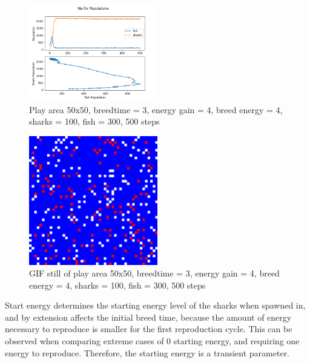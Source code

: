 \documentclass[12pt]{iopart} %
\begin{document}
\begin{figure}[h!tbp]
  \begin{center}
  \item[]\includegraphics[width=0.5\textwidth]{figure23.png}
  \caption{\label{fig:figure23}
  Play area 50x50, breedtime = 3, energy gain = 4, breed energy = 4, sharks = 100, fish = 300, 500 steps
  }
  \end{center}
\end{figure}

\begin{figure}[h!tbp]
  \begin{center}
  \item[]\includegraphics[width=0.5\textwidth]{figure24.png}
  \caption{\label{fig:figure24}
  GIF still of play area 50x50, breedtime = 3, energy gain = 4, breed energy = 4, sharks = 100, fish = 300, 500 steps
  }
  \end{center}
\end{figure}

\pagebreak

\subtitle{\textbf{Effects of Other Parameters}}

Start energy determines the starting energy level of the sharks when spawned in, and by extension affects the initial breed time, because the amount of energy necessary to reproduce is smaller for the first reproduction cycle. 
This can be observed when comparing extreme cases of 0 starting energy, and requiring one energy to reproduce. 
Therefore, the starting energy is a transient parameter.
\end{document}

